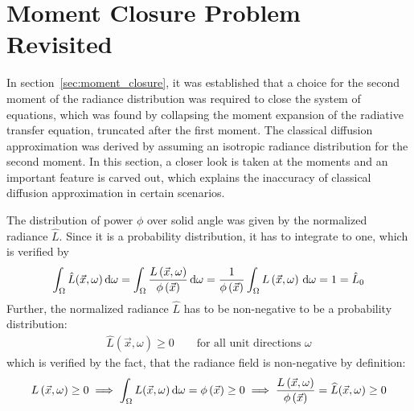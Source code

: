 \section{Moment Closure Problem Revisited}
\label{sec:moment_problem_revisited}

In section~\ref{sec:moment_closure}, it was established that a choice for the second moment of the radiance distribution was required to close the system of equations, which was found by collapsing the moment expansion of the radiative transfer equation, truncated after the first moment. The classical diffusion approximation was derived by assuming an isotropic radiance distribution for the second moment. In this section, a closer look is taken at the moments and an important feature is carved out, which explains the inaccuracy of classical diffusion approximation in certain scenarios.

The distribution of power $\phi$ over solid angle was given by the normalized radiance $\widehat{L}$. Since it is a probability distribution, it has to integrate to one, which is verified by
\begin{align*}
\int_{\Omega}{\hat{L}(\vec{x}, \omega)\,\mathrm{d}\omega}=
\int_{\Omega}{\frac{L\left(\vec{x}, \omega\right)}{\phi\left(\vec{x}\right)}\,\mathrm{d}\omega}=
\frac{1}{\phi\left(\vec{x}\right)}
\int_{\Omega}{L\left(\vec{x}, \omega\right)\,\mathrm{d}\omega}
=1
=\hat{L}_0
\end{align*}
Further, the normalized radiance $\widehat{L}$ has to be non-negative to be a probability distribution:
\begin{align*}
\hat{L}(\vec{x}, \omega)\ge 0 \qquad \text{for all unit directions } \omega
\end{align*}
which is verified by the fact, that the radiance field is non-negative by definition:
\begin{align*}
L\left(\vec{x}, \omega\right) \ge 0
\implies
\int_{\Omega}{L(\vec{x}, \omega)\,\mathrm{d}\omega}=\phi\left(\vec{x}\right)\ge 0
\implies
\frac{L\left(\vec{x}, \omega\right)}{\phi\left(\vec{x}\right)}=\widehat{L}(\vec{x}, \omega) \ge 0
\end{align*}

